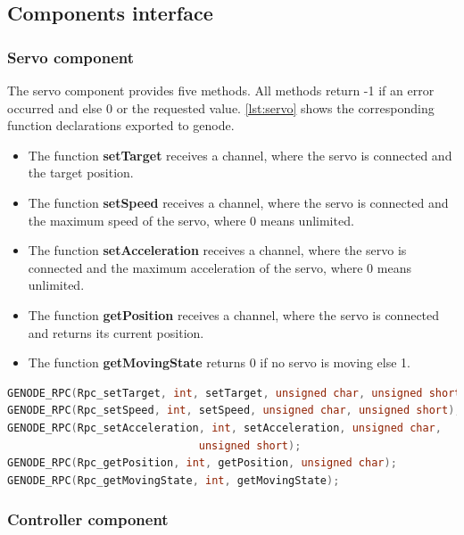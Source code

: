 \newpage
\subsection{Components interface}
\label{sec:comp}


\subsubsection{Servo component}
\label{sec:comp-servo}

The servo component provides five methods. All methods return -1 if an error occurred and else 0 or the requested value.
\autoref{lst:servo} shows the corresponding function declarations exported to genode.
\begin{itemize}
\item The function \textbf{setTarget} receives a channel, where the servo is connected and the target position.
\item The function \textbf{setSpeed} receives a channel, where the servo is connected and the maximum speed of the servo, where 0 means unlimited.
\item The function \textbf{setAcceleration} receives a channel, where the servo is connected and the maximum acceleration of the servo, where 0 means unlimited.
\item The function \textbf{getPosition} receives a channel, where the servo is connected and returns its current position.
\item The function \textbf{getMovingState} returns 0 if no servo is moving else 1.
\end{itemize}

\begin{lstlisting}[language=c, frame=single, basicstyle=\footnotesize,  label={lst:servo}, caption=Genode interface for servo component]
GENODE_RPC(Rpc_setTarget, int, setTarget, unsigned char, unsigned short);
GENODE_RPC(Rpc_setSpeed, int, setSpeed, unsigned char, unsigned short);
GENODE_RPC(Rpc_setAcceleration, int, setAcceleration, unsigned char, 
						      unsigned short);
GENODE_RPC(Rpc_getPosition, int, getPosition, unsigned char);
GENODE_RPC(Rpc_getMovingState, int, getMovingState);
\end{lstlisting}

\subsubsection{Controller component}
\label{sec:comp-controller}

